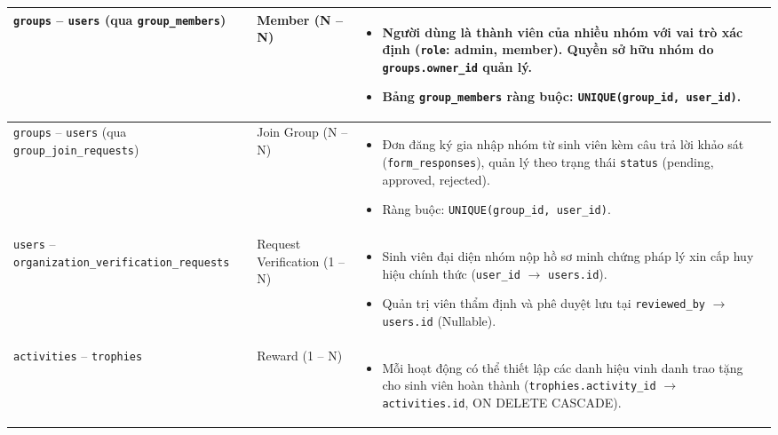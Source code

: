 \begin{longtable}{|p{}|p{}|p{}|}
    \texttt{groups} -- \texttt{users} \newline (qua \texttt{group\_members}) & Member \newline (N -- N) & 
    \begin{itemize}
        \item Người dùng là thành viên của nhiều nhóm với vai trò xác định (\texttt{role}: admin, member). Quyền sở hữu nhóm do \texttt{groups.owner\_id} quản lý.
        \item Bảng \texttt{group\_members} ràng buộc: \texttt{UNIQUE(group\_id, user\_id)}.
    \end{itemize} \\ \hline

    \texttt{groups} -- \texttt{users} \newline (qua \texttt{group\_join\_requests}) & Join Group \newline (N -- N) & 
    \begin{itemize}
        \item Đơn đăng ký gia nhập nhóm từ sinh viên kèm câu trả lời khảo sát (\texttt{form\_responses}), quản lý theo trạng thái \texttt{status} (pending, approved, rejected).
        \item Ràng buộc: \texttt{UNIQUE(group\_id, user\_id)}.
    \end{itemize} \\ \hline

    \texttt{users} -- \texttt{organization\_verification\_requests} & Request Verification \newline (1 -- N) & 
    \begin{itemize}
        \item Sinh viên đại diện nhóm nộp hồ sơ minh chứng pháp lý xin cấp huy hiệu chính thức (\texttt{user\_id} $\rightarrow$ \texttt{users.id}).
        \item Quản trị viên thẩm định và phê duyệt lưu tại \texttt{reviewed\_by} $\rightarrow$ \texttt{users.id} (Nullable).
    \end{itemize} \\ \hline

    \texttt{activities} -- \texttt{trophies} & Reward \newline (1 -- N) & 
    \begin{itemize}
        \item Mỗi hoạt động có thể thiết lập các danh hiệu vinh danh trao tặng cho sinh viên hoàn thành (\texttt{trophies.activity\_id} $\rightarrow$ \texttt{activities.id}, ON DELETE CASCADE).
    \end{itemize} \\ \hline


\end{longtable}

